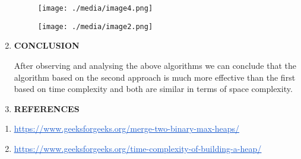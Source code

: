 \begin{multicols}{2}
\begin{enumerate}
\vspace{\baselineskip}
\begin{figure}[H]
	\begin{Center}
		\texttt{[image: ./media/image4.png]}
	\end{Center}
\end{figure}
\par


\vspace{\baselineskip}

\begin{figure}[H]
	\begin{Center}
		\texttt{[image: ./media/image2.png]}
	\end{Center}
\end{figure}

\par


\vspace{\baselineskip}

\vspace{\baselineskip}
	\item \textbf{CONCLUSION}\par

After observing and analysing the above algorithms we can conclude that the algorithm based on the second approach is much more effective than the first based on time complexity and both are similar in terms of space complexity.\par


\vspace{\baselineskip}
	\item \textbf{ REFERENCES}
\end{enumerate}\par

\begin{enumerate}
	\item \href{https://www.geeksforgeeks.org/merge-two-binary-max-heaps/}{\textcolor[HTML]{1155CC}{\ul{https://www.geeksforgeeks.org/merge-two-binary-max-heaps/}}}\par

	\item \href{https://www.geeksforgeeks.org/time-complexity-of-building-a-heap/}{\textcolor[HTML]{1155CC}{\ul{https://www.geeksforgeeks.org/time-complexity-of-building-a-heap/}}}
\end{enumerate}\par


\vspace{\baselineskip}


\end{multicols}
